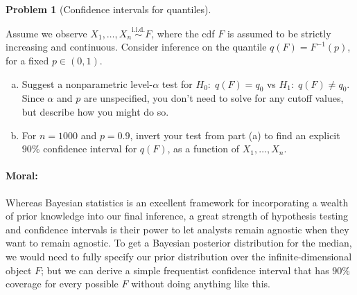 \documentclass{article}
\newcommand{\simiid}{\overset{\text{i.i.d.}}{\sim}}
\theoremstyle{definition}
\newtheorem{problem}{Problem}
\begin{document}
\begin{problem}[Confidence intervals for quantiles]
  \label{prob:conf-quantiles}

  Assume we observe $X_1,\ldots,X_n \simiid F$, where the cdf $F$ is assumed to be strictly increasing and continuous. Consider inference on the quantile $q(F) = F^{-1}(p)$, for a fixed $p \in (0,1)$.

  \begin{enumerate}[(a)]
  \item Suggest a nonparametric level-$\alpha$ test for $H_0:\; q(F) = q_0$ vs $H_1:\; q(F) \neq q_0$. Since $\alpha$ and $p$ are unspecified, you don't need to solve for any cutoff values, but describe how you might do so.

    
  \item For $n = 1000$ and $p = 0.9$, invert your test from part (a) to find an explicit $90\%$ confidence interval for $q(F)$, as a function of $X_1,\ldots,X_n$.

    
  \end{enumerate}

\paragraph{Moral:} Whereas Bayesian statistics is an excellent framework for incorporating a wealth of prior knowledge into our final inference, a great strength of hypothesis testing and confidence intervals is their power to let analysts remain agnostic when they want to remain agnostic. To get a Bayesian posterior distribution for the median, we would need to fully specify our prior distribution over the infinite-dimensional object $F$; but we can derive a simple frequentist confidence interval that has $90\%$ coverage for every possible $F$ without doing anything like this.

\end{problem}
\end{document}
